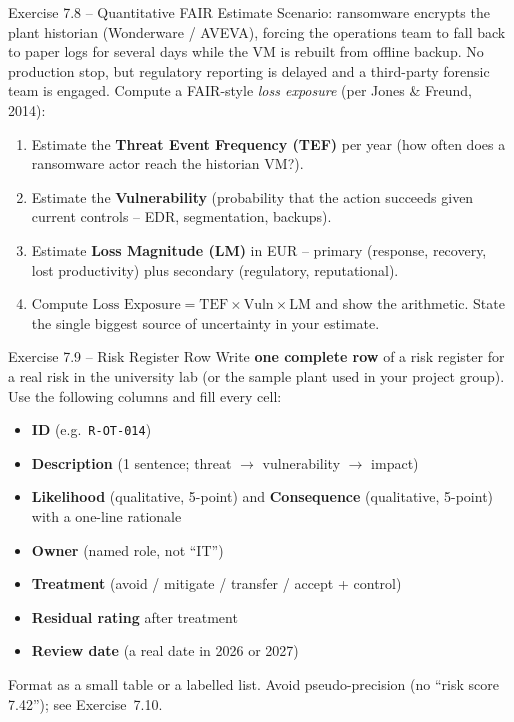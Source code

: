 \documentclass[11pt,a4paper]{article}
\begin{document}
\begin{taskbox}{Exercise 7.8 -- Quantitative FAIR Estimate}
Scenario: ransomware encrypts the plant historian (Wonderware / AVEVA),
forcing the operations team to fall back to paper logs for several days
while the VM is rebuilt from offline backup. No production stop, but
regulatory reporting is delayed and a third-party forensic team is engaged.
Compute a FAIR-style \emph{loss exposure} (per Jones \& Freund, 2014):
\begin{enumerate}
  \item Estimate the \textbf{Threat Event Frequency (TEF)} per year
        (how often does a ransomware actor reach the historian VM?).
  \item Estimate the \textbf{Vulnerability} (probability that the action
        succeeds given current controls -- EDR, segmentation, backups).
  \item Estimate \textbf{Loss Magnitude (LM)} in EUR -- primary
        (response, recovery, lost productivity) plus secondary
        (regulatory, reputational).
  \item Compute
        $\text{Loss Exposure} = \text{TEF} \times \text{Vuln} \times \text{LM}$
        and show the arithmetic. State the single biggest source of
        uncertainty in your estimate.
\end{enumerate}
\end{taskbox}

\begin{taskbox}{Exercise 7.9 -- Risk Register Row}
Write \textbf{one complete row} of a risk register for a real risk in the
university lab (or the sample plant used in your project group). Use the
following columns and fill every cell:
\begin{itemize}
  \item \textbf{ID} (e.g.\ \texttt{R-OT-014})
  \item \textbf{Description} (1 sentence; threat $\to$ vulnerability $\to$ impact)
  \item \textbf{Likelihood} (qualitative, 5-point) and \textbf{Consequence}
        (qualitative, 5-point) with a one-line rationale
  \item \textbf{Owner} (named role, not ``IT'')
  \item \textbf{Treatment} (avoid / mitigate / transfer / accept + control)
  \item \textbf{Residual rating} after treatment
  \item \textbf{Review date} (a real date in 2026 or 2027)
\end{itemize}
Format as a small table or a labelled list. Avoid pseudo-precision
(no ``risk score 7.42''); see Exercise~7.10.
\end{taskbox}
\end{document}
